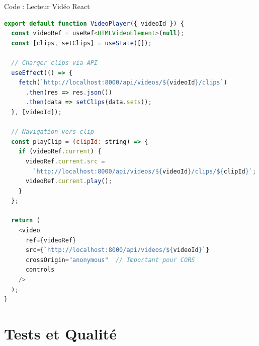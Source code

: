 \documentclass[11pt]{beamer}
\begin{document}
\begin{frame}[fragile]{Code : Lecteur Vidéo React}
\begin{lstlisting}[language=JavaScript, caption=Composant VideoPlayer avec Range Requests]
export default function VideoPlayer({ videoId }) {
  const videoRef = useRef<HTMLVideoElement>(null);
  const [clips, setClips] = useState([]);
  
  // Charger clips via API
  useEffect(() => {
    fetch(`http://localhost:8000/api/videos/${videoId}/clips`)
      .then(res => res.json())
      .then(data => setClips(data.sets));
  }, [videoId]);
  
  // Navigation vers clip
  const playClip = (clipId: string) => {
    if (videoRef.current) {
      videoRef.current.src = 
        `http://localhost:8000/api/videos/${videoId}/clips/${clipId}`;
      videoRef.current.play();
    }
  };
  
  return (
    <video 
      ref={videoRef}
      src={`http://localhost:8000/api/videos/${videoId}`}
      crossOrigin="anonymous"  // Important pour CORS
      controls
    />
  );
}
\end{lstlisting}
\end{frame}

\section{Tests et Qualité}
\end{document}
